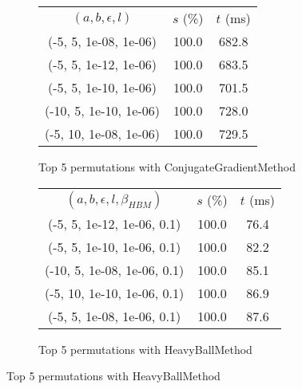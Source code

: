 \begin{figure}[H]
{\begin{subfigure}[ht]{.6\textwidth}
\begin{tabular}{|c|c|c|}
\hline
\rowcolor{gray!25}
\multicolumn{3}{|c|}{ConjugateGradientMethod} \\
\hline
\rowcolor{gray!25}
$(a,b,\epsilon,l)$ & $s$ (\%) & $t$ (ms) \\
\hline
(-5, 5, 1e-08, 1e-06) & 100.0 & 682.8 \\
(-5, 5, 1e-12, 1e-06) & 100.0 & 683.5 \\
(-5, 5, 1e-10, 1e-06) & 100.0 & 701.5 \\
(-10, 5, 1e-10, 1e-06) & 100.0 & 728.0 \\
(-5, 10, 1e-08, 1e-06) & 100.0 & 729.5 \\
\hline
\end{tabular}
\caption{Top 5 permutations with ConjugateGradientMethod}
\label{subfig:param_comp_NegativeEntropy_ConjugateGradientMethod_FibonacciSearch}
\end{subfigure}
\hfill
\begin{subfigure}[ht]{.6\textwidth}
\centering
{}
\begin{tabular}{|c|c|c|}
\hline
\rowcolor{gray!25}
\multicolumn{3}{|c|}{HeavyBallMethod} \\
\hline
\rowcolor{gray!25}
$(a,b,\epsilon,l,\beta_{HBM})$ & $s$ (\%) & $t$ (ms) \\
\hline
(-5, 5, 1e-12, 1e-06, 0.1) & 100.0 & 76.4 \\
(-5, 5, 1e-10, 1e-06, 0.1) & 100.0 & 82.2 \\
(-10, 5, 1e-08, 1e-06, 0.1) & 100.0 & 85.1 \\
(-5, 10, 1e-10, 1e-06, 0.1) & 100.0 & 86.9 \\
(-5, 5, 1e-08, 1e-06, 0.1) & 100.0 & 87.6 \\
\hline
\end{tabular}
\caption{Top 5 permutations with HeavyBallMethod}
\label{subfig:param_comp_NegativeEntropy_HeavyBallMethod_FibonacciSearch}
\end{subfigure}
}
\end{figure}
